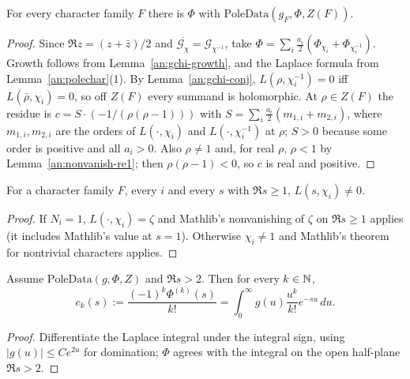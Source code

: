 \begin{lemma}\label{an:poledata-lemma}
For every character family $F$ there is $\Phi$ with
$\mathrm{PoleData}(g_F,\Phi,Z(F))$.
\end{lemma}
\begin{proof}
Since $\Re z=(z+\bar z)/2$ and $\overline{\mathcal G_{\chi}}=\mathcal
G_{\chi^{-1}}$, take $\Phi=\sum_i\frac{a_i}2(\Phi_{\chi_i}+\Phi_{\chi_i^{-1}})$.
Growth follows from Lemma~\ref{an:gchi-growth}, and the Laplace formula
from Lemma~\ref{an:polechar}(1). By Lemma~\ref{an:gchi-conj},
$L(\rho,\chi_i^{-1})=0$ iff $L(\bar\rho,\chi_i)=0$, so off $Z(F)$ every
summand is holomorphic. At $\rho\in Z(F)$ the residue is
$c=S\cdot(-1/(\rho(\rho-1)))$ with
$S=\sum_i\frac{a_i}{2}(m_{1,i}+m_{2,i})$, where $m_{1,i},m_{2,i}$ are the
orders of $L(\cdot,\chi_i)$ and $L(\cdot,\chi_i^{-1})$ at $\rho$; $S>0$
because some order is positive and all $a_i>0$. Also $\rho\ne1$ and, for
real $\rho$, $\rho<1$ by Lemma~\ref{an:nonvanish-re1}; then
$\rho(\rho-1)<0$, so $c$ is real and positive.
\end{proof}

\begin{lemma}[Nonvanishing on $\Re s\ge1$]\label{an:nonvanish-re1}
For a character family $F$, every $i$ and every $s$ with $\Re s\ge1$,
$L(s,\chi_i)\ne0$.
\end{lemma}
\begin{proof}
If $N_i=1$, $L(\cdot,\chi_i)=\zeta$ and Mathlib's nonvanishing of $\zeta$ on
$\Re s\ge1$ applies (it includes Mathlib's value at $s=1$). Otherwise
$\chi_i\ne1$ and Mathlib's theorem for nontrivial characters applies.
\end{proof}

\begin{lemma}\label{an:coeff}
Assume $\mathrm{PoleData}(g,\Phi,Z)$ and $\Re s>2$. Then for every
$k\in\mathbb{N}$,
\[
c_k(s):=\frac{(-1)^k\Phi^{(k)}(s)}{k!}=\int_0^{\infty} g(u)\frac{u^k}{k!}e^{-su}\,du.
\]
\end{lemma}
\begin{proof}
Differentiate the Laplace integral under the integral sign, using
$|g(u)|\le Ce^{2u}$ for domination; $\Phi$ agrees with the integral on
the open half-plane $\Re s>2$.
\end{proof}

